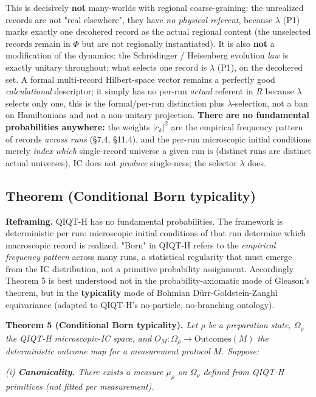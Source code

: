 \documentclass[11pt,a4paper]{article}
\begin{document}
This is decisively \textbf{not} many-worlds with regional coarse-graining: the unrealized records are not "real elsewhere", they have \emph{no physical referent}, because $\lambda$ (P1) marks exactly one decohered record as the actual regional content (the unselected records remain in $\Phi$ but are not regionally instantiated). It is also \textbf{not} a modification of the dynamics: the Schrödinger / Heisenberg evolution \emph{law} is exactly unitary throughout; what selects one record is $\lambda$ (P1), on the decohered set. A formal multi-record Hilbert-space vector remains a perfectly good \emph{calculational} descriptor; it simply has no per-run \emph{actual} referent in $R$ because $\lambda$ selects only one, this is the formal/per-run distinction plus $\lambda$-selection, not a ban on Hamiltonians and not a non-unitary projection. \textbf{There are no fundamental probabilities anywhere:} the weights $|c_k|^2$ are the empirical frequency pattern of records \emph{across runs} (§7.4, §11.4), and the per-run microscopic initial conditions merely \emph{index which} single-record universe a given run is (distinct runs are distinct actual universes), IC does not \emph{produce} single-ness; the selector $\lambda$ does.

\subsection{Theorem (Conditional Born typicality)}

\textbf{Reframing.} QIQT-H has no fundamental probabilities. The framework is deterministic per run: microscopic initial conditions of that run determine which macroscopic record is realized. "Born" in QIQT-H refers to the \emph{empirical frequency pattern} across many runs, a statistical regularity that must emerge from the IC distribution, not a primitive probability assignment. Accordingly Theorem 5 is best understood not in the probability-axiomatic mode of Gleason's theorem, but in the \textbf{typicality} mode of Bohmian Dürr-Goldstein-Zanghì equivariance (adapted to QIQT-H's no-particle, no-branching ontology).

\textbf{Theorem 5 (Conditional Born typicality).} \emph{Let $\rho$ be a preparation state, $\Omega_\rho$ the QIQT-H microscopic-IC space, and $O_M : \Omega_\rho \to \mathrm{Outcomes}(M)$ the deterministic outcome map for a measurement protocol $M$. Suppose:}

\emph{(i) \textbf{Canonicality.} There exists a measure $\mu_\rho$ on $\Omega_\rho$ defined from QIQT-H primitives (not fitted per measurement).}
\end{document}
